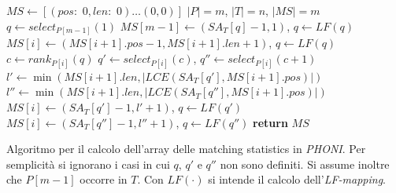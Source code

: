 \begin{algorithm}
  \small
  \begin{algorithmic}[1]
    \State $MS\gets [(pos:\,\,0,len:\,\,0)\ldots (0,0)]$
     \Comment $|P|=m$, $|T|=n$, $|MS|=m$
    \State $q\gets select_{P[m-1]}(1)$
    \State $MS[m-1]\gets (SA_T[q]-1,1)$, $q\gets LF(q)$
    \State $MS[i]\gets (MS[i+1].pos-1,MS[i+1].len+1)$, $q\gets LF(q)$
    \Else
    \State $c\gets rank_{P[i]}(q)$
    \State $q'\gets select_{P[i]}(c)$, $q''\gets select_{P[i]}(c+1)$
    \State $l'\gets \min\left(MS[i+1].len, \left|LCE(SA_T[q'],
    MS[i+1].pos)\right|\right)$
    \State $l''\gets \min\left(MS[i+1].len, \left|LCE(SA_T[q''],
    MS[i+1].pos)\right|\right)$ 
    \EndIf
    \State $MS[i]\gets (SA_T[q']-1,l'+1)$, $q\gets LF(q')$
    \Else
    \State $MS[i]\gets (SA_T[q'']-1,l''+1)$, $q\gets LF(q'')$
    \EndIf
    \EndFor
    \State \textbf{return} $MS$
    \EndFunction
  \end{algorithmic}
  \caption{Algoritmo per il calcolo dell'array delle matching statistics in
  \textit{PHONI}. Per 
  semplicità si ignorano i casi in cui $q$, $q'$ e $q''$ non sono definiti. Si
  assume inoltre che $P[m-1]$ occorre in $T$. Con $LF(\cdot)$ si intende il
  calcolo dell'\textit{LF-mapping}.}
  \label{algo:phonims}
\end{algorithm}
